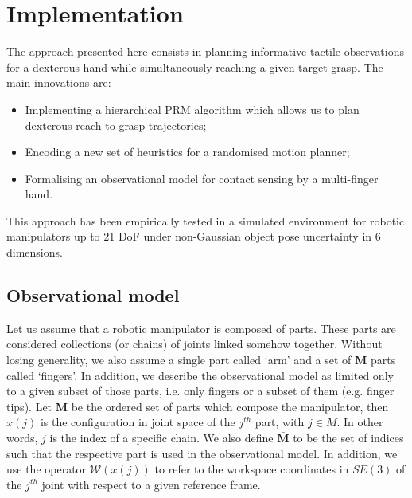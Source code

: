 \section{Implementation}\label{sec:ch06:solution_domain}


%
%
The approach presented here consists in planning informative tactile observations for a dexterous hand while simultaneously reaching a given target grasp. 
The main innovations are:
\begin{itemize}
\item Implementing a hierarchical PRM algorithm which allows us to plan dexterous reach-to-grasp trajectories;

\item Encoding a new set of heuristics for a randomised motion planner;

\item Formalising an observational model for contact sensing by a multi-finger hand. 
\end{itemize}
This approach has been empirically tested in a simulated environment for robotic manipulators up to 21 DoF under non-Gaussian object pose uncertainty in 6 dimensions. 

\subsection{Observational model}\label{sec:ch06:observational_model}

Let us assume that a robotic manipulator is composed of parts. These parts are considered collections (or chains) of joints linked somehow together. Without losing generality, we also assume a single part called `arm' and a set of $\mathbf{M}$ parts called `fingers'. In addition, we describe the observational model as limited only to a given subset of those parts, i.e. only fingers or a subset of them (e.g. finger tips). Let $\mathbf{M}$ be the ordered set of parts which compose the manipulator, then $x(j)$ is the configuration in joint space of the $j^{th}$ part, with $j\in M$. In other words, $j$ is the index of a specific chain. We also define $\bar{\mathbf{M}}$ to be the set of indices such that the respective part is used in the observational model. In addition, we use the operator $\mathcal{W}(x(j))$ to refer to the workspace coordinates in $SE(3)$ of the $j^{th}$ joint with respect to a given reference frame.  

